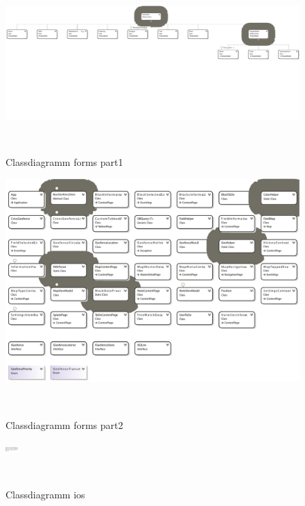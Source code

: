 \documentclass[12pt]{article}
\begin{document}
  \begin{figure}

  	\centering
  	\includegraphics[width=\paperwidth, keepaspectratio=true]{ClassDiagram1-part1.pdf}
  	\caption{Classdiagramm forms part1}\label{classdiagram}\
  \end{figure}
  
  \begin{figure}

  	\centering
  	\includegraphics[width=\paperwidth, keepaspectratio=true]{ClassDiagram1-part2.pdf}
  	\caption{Classdiagramm forms part2}\label{classdiagram}\
  \end{figure}

  \begin{figure}

  	\centering
  	\includegraphics[width=\paperwidth, keepaspectratio=true]{ClassDiagramiOS.pdf}
  	\caption{Classdiagramm ios}\label{classdiagram}\
  \end{figure}
\end{document}

